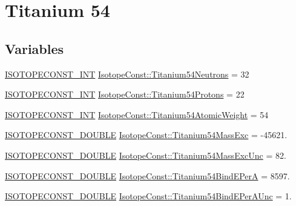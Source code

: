 \hypertarget{group___isotope_const-_titanium-_ti54}{}\section{Titanium 54}
\label{group___isotope_const-_titanium-_ti54}
\subsection*{Variables}
\begin{DoxyCompactItemize}
\item 
\mbox{\hyperlink{group___isotope_const-_macros_ga5f18360b3e99483a35c32d789e62621c}{I\+S\+O\+T\+O\+P\+E\+C\+O\+N\+S\+T\+\_\+\+I\+NT}} \mbox{\hyperlink{group___isotope_const-_titanium-_ti54_ga6494a16e1c671c51a3e7f63e13386020}{Isotope\+Const\+::\+Titanium54\+Neutrons}} = 32
\item 
\mbox{\hyperlink{group___isotope_const-_macros_ga5f18360b3e99483a35c32d789e62621c}{I\+S\+O\+T\+O\+P\+E\+C\+O\+N\+S\+T\+\_\+\+I\+NT}} \mbox{\hyperlink{group___isotope_const-_titanium-_ti54_ga7ed1d41c0fe3f399ef75630b21bfe61b}{Isotope\+Const\+::\+Titanium54\+Protons}} = 22
\item 
\mbox{\hyperlink{group___isotope_const-_macros_ga5f18360b3e99483a35c32d789e62621c}{I\+S\+O\+T\+O\+P\+E\+C\+O\+N\+S\+T\+\_\+\+I\+NT}} \mbox{\hyperlink{group___isotope_const-_titanium-_ti54_ga23e112f5bfe83c0f3f829b72ccaef8e3}{Isotope\+Const\+::\+Titanium54\+Atomic\+Weight}} = 54
\item 
\mbox{\hyperlink{group___isotope_const-_macros_ga8f45a7272ce02c0b4c65c44636ed719a}{I\+S\+O\+T\+O\+P\+E\+C\+O\+N\+S\+T\+\_\+\+D\+O\+U\+B\+LE}} \mbox{\hyperlink{group___isotope_const-_titanium-_ti54_ga7a5df60fde77554442562b451e774a01}{Isotope\+Const\+::\+Titanium54\+Mass\+Exc}} = -\/45621.
\item 
\mbox{\hyperlink{group___isotope_const-_macros_ga8f45a7272ce02c0b4c65c44636ed719a}{I\+S\+O\+T\+O\+P\+E\+C\+O\+N\+S\+T\+\_\+\+D\+O\+U\+B\+LE}} \mbox{\hyperlink{group___isotope_const-_titanium-_ti54_ga70eac362df4bbcb02f494c4f06d15a06}{Isotope\+Const\+::\+Titanium54\+Mass\+Exc\+Unc}} = 82.
\item 
\mbox{\hyperlink{group___isotope_const-_macros_ga8f45a7272ce02c0b4c65c44636ed719a}{I\+S\+O\+T\+O\+P\+E\+C\+O\+N\+S\+T\+\_\+\+D\+O\+U\+B\+LE}} \mbox{\hyperlink{group___isotope_const-_titanium-_ti54_ga32984e10509841e63e4504e0b6e962cb}{Isotope\+Const\+::\+Titanium54\+Bind\+E\+PerA}} = 8597.
\item 
\mbox{\hyperlink{group___isotope_const-_macros_ga8f45a7272ce02c0b4c65c44636ed719a}{I\+S\+O\+T\+O\+P\+E\+C\+O\+N\+S\+T\+\_\+\+D\+O\+U\+B\+LE}} \mbox{\hyperlink{group___isotope_const-_titanium-_ti54_ga396eb3022801e2082d99be82752b0bc9}{Isotope\+Const\+::\+Titanium54\+Bind\+E\+Per\+A\+Unc}} = 1.

\end{DoxyCompactItemize}
